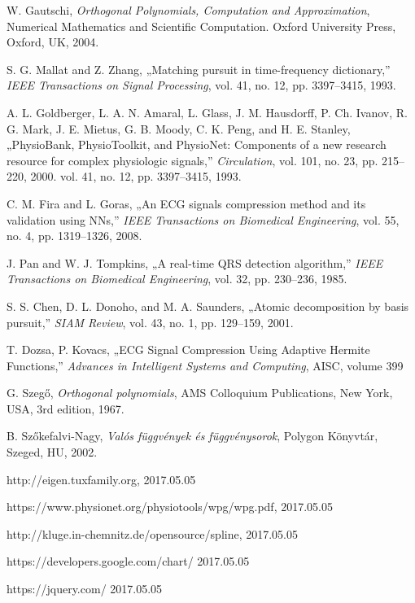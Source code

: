 \documentclass[oneside,titlepage,12pt,a4paper]{report}
\begin{document}
\begin{thebibliography}{9}
W. Gautschi,
\textit{Orthogonal Polynomials, Computation and Approximation},
Numerical Mathematics and Scientific Computation. Oxford University Press, Oxford,
UK, 2004.

S. G. Mallat and Z. Zhang,
„Matching pursuit in time-frequency dictionary,”
\textit{IEEE Transactions on Signal Processing},
vol. 41, no. 12, pp. 3397–3415, 1993.

A. L. Goldberger, L. A. N. Amaral, L. Glass, J. M. Hausdorff, P. Ch. Ivanov,
R. G. Mark, J. E. Mietus, G. B. Moody, C. K. Peng, and H. E. Stanley,
„PhysioBank, PhysioToolkit, and PhysioNet: Components of a new research resource
for complex physiologic signals,”
\textit{Circulation}, vol. 101, no. 23, pp. 215–220, 2000.
vol. 41, no. 12, pp. 3397–3415, 1993.

C. M. Fira and L. Goras,
„An ECG signals compression method and its validation using NNs,”
\textit{IEEE Transactions on Biomedical Engineering},
vol. 55, no. 4, pp. 1319–1326, 2008.

J. Pan and W. J. Tompkins,
„A real-time QRS detection algorithm,”
\textit{IEEE Transactions on Biomedical Engineering},
vol. 32, pp. 230–236, 1985.

S. S. Chen, D. L. Donoho, and M. A. Saunders,
„Atomic decomposition by basis pursuit,”
\textit{SIAM Review},
vol. 43, no. 1, pp. 129–159, 2001.

T. Dozsa, P. Kovacs,
„ECG Signal Compression Using Adaptive Hermite Functions,”
\textit{ Advances in Intelligent Systems and Computing},
AISC, volume 399

G. Szegő,
\textit{Orthogonal polynomials},
AMS Colloquium Publications, New York, USA, 3rd edition, 1967.

B. Szőkefalvi-Nagy,
\textit{Valós függvények és függvénysorok},
Polygon Könyvtár, Szeged, HU, 2002.

http://eigen.tuxfamily.org,
2017.05.05

https://www.physionet.org/physiotools/wpg/wpg.pdf,
2017.05.05

http://kluge.in-chemnitz.de/opensource/spline,
2017.05.05

https://developers.google.com/chart/
2017.05.05

https://jquery.com/
2017.05.05


\end{thebibliography}
\end{document}
